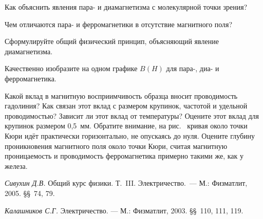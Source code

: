 \begin{lab:questions}

	\item Как объяснить явления пара- и диамагнетизма с молекулярной точки зрения?
	
	\item Чем отличаются пара- и ферромагнетики в отсутствие магнитного поля?
	
	\item Сформулируйте общий физический принцип, объясняющий явление диамагнетизма.
	
	\item Качественно изобразите на одном графике $B(H)$ для пара-, диа- и ферромагнетика.
	
	\item Какой вклад в магнитную восприимчивость образца вносит проводимость гадолиния? Как связан этот вклад с размером 
	крупинок, частотой и удельной проводимостью? Зависит ли этот вклад от температуры? Оцените этот вклад для крупинок
	размером 0,5~мм. Обратите внимание, на рис.~ кривая около точки Кюри идёт практически горизонтально, не опускаясь до нуля. Оцените  глубину проникновения магнитного поля около точки Кюри, считая магнитную проницаемость и проводимость ферромагнетика примерно такими же, как у железа.
\end{lab:questions}


\begin{lab:literature}
	\item \emph {Сивухин Д.В.} Общий курс физики. Т.~III. Электричество.~--- М.: Физматлит, 2005. \S\S~74, 79.
	
	\item \emph{Калашников С.Г.} Электричество. --- М.: Физматлит, 2003. \S\S~110, 111, 119.
\end{lab:literature}

